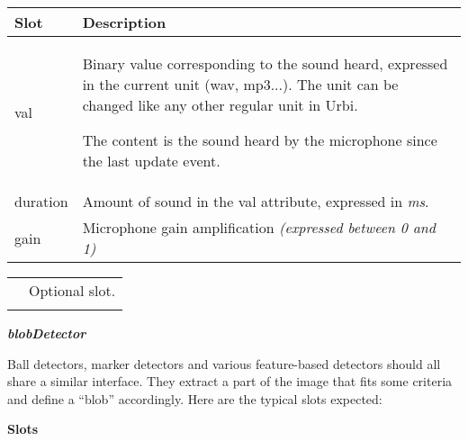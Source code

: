 \documentclass[a4paper]{article}
\begin{document}
\begin{flushleft}
\tablehead{}
\begin{supertabular}{|m{3.293cm}|m{11.997cm}|}
\hline
{}\sffamily\bfseries Slot &
\sffamily\bfseries Description\\\hline
{} val &
{\sffamily Binary value corresponding to the
sound heard, expressed in the current unit (wav, mp3...). The unit can
be changed like any other regular unit in Urbi. }

 \textsf{The content is the sound heard by the
microphone since the last }update\textsf{ event.}\\\hline
{} duration &
 \textsf{Amount of sound in the }val\textsf{
attribute, expressed in }\textsf{\textit{ms}}\textsf{.}\\\hline
{} gain &
 \textsf{Microphone gain amplification
}\textsf{\textit{(expressed between 0 and 1)}}\\\hline
\end{supertabular}
\end{flushleft}
\begin{flushleft}
\tablehead{}
\begin{supertabular}{|m{1.717cm}|m{10.464cm}}
\hhline{-~}
 &
\sffamily Optional slot.\\\hhline{-~}
\end{supertabular}
\end{flushleft}
{\sffamily\bfseries\itshape
blobDetector}

{\sffamily
Ball detectors, marker detectors and various feature-based detectors
should all share a similar interface. They extract a part of the image
that fits some criteria and define a “blob” accordingly. Here are the
typical slots expected:}

{\sffamily\bfseries
Slots}
\end{document}
